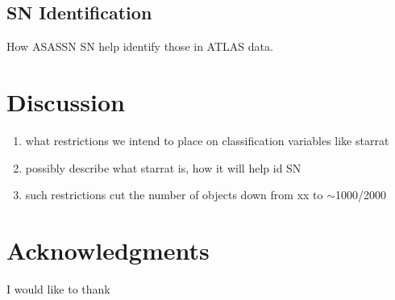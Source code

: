 \documentclass[aps,prb,twocolumn,superscriptaddress]{revtex4-1}
\begin{document}
\subsection{SN Identification}
How ASASSN SN help identify those in ATLAS data.



\section{Discussion}
\begin{enumerate}
	\item{} what restrictions we intend to place on classification variables like starrat
	\item{} possibly describe what starrat is, how it will help id SN
	\item{} such restrictions cut the number of objects down from xx to $\sim$1000/2000
\end{enumerate}




\section*{Acknowledgments}
I would like to thank   %



\setlength{\parindent}{0cm}



\end{document}
